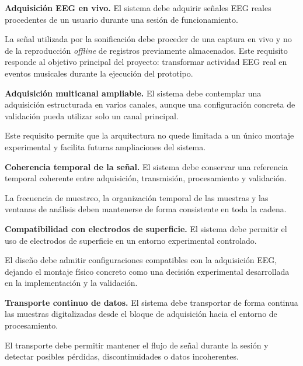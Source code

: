 \documentclass[../main.tex]{subfiles}
\begin{document}
\begin{description}[leftmargin=!,labelwidth=2cm]

    \item[RF-1] \textbf{Adquisición EEG en vivo.} El sistema debe adquirir señales EEG reales procedentes de un usuario durante una sesión de funcionamiento.

    La señal utilizada por la sonificación debe proceder de una captura en vivo y no de la reproducción \textit{offline} de registros previamente almacenados. Este requisito responde al objetivo principal del proyecto: transformar actividad EEG real en eventos musicales durante la ejecución del prototipo.

    \item[RF-2] \textbf{Adquisición multicanal ampliable.} El sistema debe contemplar una adquisición estructurada en varios canales, aunque una configuración concreta de validación pueda utilizar solo un canal principal.

    Este requisito permite que la arquitectura no quede limitada a un único montaje experimental y facilita futuras ampliaciones del sistema.

    \item[RF-3] \textbf{Coherencia temporal de la señal.} El sistema debe conservar una referencia temporal coherente entre adquisición, transmisión, procesamiento y validación.

    La frecuencia de muestreo, la organización temporal de las muestras y las ventanas de análisis deben mantenerse de forma consistente en toda la cadena.

    \item[RF-4] \textbf{Compatibilidad con electrodos de superficie.} El sistema debe permitir el uso de electrodos de superficie en un entorno experimental controlado.

    El diseño debe admitir configuraciones compatibles con la adquisición EEG, dejando el montaje físico concreto como una decisión experimental desarrollada en la implementación y la validación.

    \item[RF-5] \textbf{Transporte continuo de datos.} El sistema debe transportar de forma continua las muestras digitalizadas desde el bloque de adquisición hacia el entorno de procesamiento.

    El transporte debe permitir mantener el flujo de señal durante la sesión y detectar posibles pérdidas, discontinuidades o datos incoherentes.


\end{description}
\end{document}
